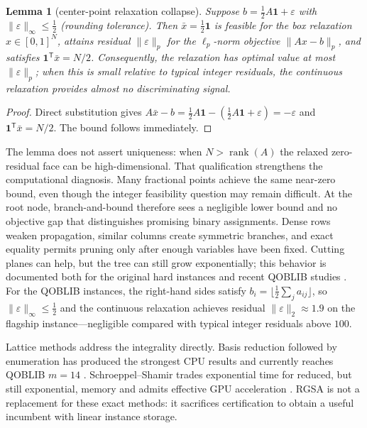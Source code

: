 \documentclass[11pt]{article}
\newtheorem{lemma}{Lemma}
\begin{document}
\begin{lemma}[center-point relaxation collapse]\label{lem:collapse}
Suppose $b=\tfrac12A\mathbf{1}+\varepsilon$ with $\|\varepsilon\|_\infty\le\tfrac12$ (rounding tolerance). Then $\bar{x}=\tfrac12\mathbf{1}$ is feasible for the box relaxation $x\in[0,1]^N$, attains residual $\|\varepsilon\|_p$ for the $\ell_p$-norm objective $\|Ax-b\|_p$, and satisfies $\mathbf{1}^{\mathsf T}\bar{x}=N/2$. Consequently, the relaxation has optimal value at most $\|\varepsilon\|_p$; when this is small relative to typical integer residuals, the continuous relaxation provides almost no discriminating signal.
\end{lemma}
\begin{proof}
Direct substitution gives
$A\bar{x}-b=\tfrac12A\mathbf{1}-(\tfrac12A\mathbf{1}+\varepsilon)=-\varepsilon$ and
$\mathbf{1}^{\mathsf T}\bar{x}=N/2$. The bound follows immediately.
\end{proof}

The lemma does not assert uniqueness: when $N>\operatorname{rank}(A)$ the relaxed zero-residual face can be high-dimensional. That qualification strengthens the computational diagnosis. Many fractional points achieve the same near-zero bound, even though the integer feasibility question may remain difficult. At the root node, branch-and-bound therefore sees a negligible lower bound and no objective gap that distinguishes promising binary assignments. Dense rows weaken propagation, similar columns create symmetric branches, and exact equality permits pruning only after enough variables have been fixed. Cutting planes can help, but the tree can still grow exponentially; this behavior is documented both for the original hard instances and recent QOBLIB studies \cite{cornuejols1998,vogel2012,wassermann2026}. For the QOBLIB instances, the right-hand sides satisfy $b_i=\lfloor\tfrac12\sum_j a_{ij}\rfloor$, so $\|\varepsilon\|_\infty\le\tfrac12$ and the continuous relaxation achieves residual $\|\varepsilon\|_2\approx1.9$ on the flagship instance---negligible compared with typical integer residuals above $100$.

Lattice methods address the integrality directly. Basis reduction followed by enumeration has produced the strongest CPU results and currently reaches QOBLIB $m=14$ \cite{aardal1999,wassermann2002,wassermann2021,wassermann2026}. Schroeppel--Shamir trades exponential time for reduced, but still exponential, memory and admits effective GPU acceleration \cite{kempkekoch2026}. RGSA is not a replacement for these exact methods: it sacrifices certification to obtain a useful incumbent with linear instance storage.
\end{document}
